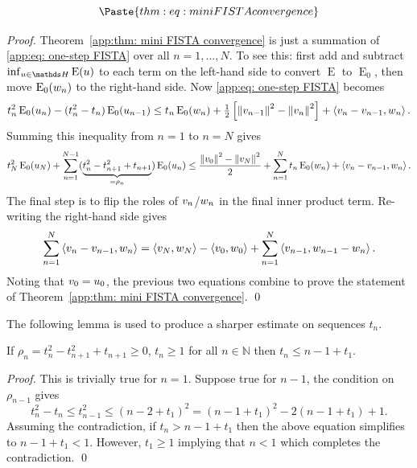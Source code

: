 \documentclass[smallextended]{svjour3}
\let\F\mathds\let\C\mathcal\newcommand{\R}{\F{R}}\newcommand{\A}{\tens{A}}
\newcommand{\norm}[1]{{\left\lVert #1 \right\rVert}}
\newcommand{\IP}[2]{\left\langle #1,#2 \right\rangle}
\newcommand{\op}[1]{\operatorname{#1}}
\newcommand{\1}{\F{1}}
\newcommand{\Emin}[1][\var0]{\inf_{#1\in\F H}\op{E}(#1)}
\newcommand*{\var}[1]{%
	\IfEqCase{#1}{%
		{0}{u}%
		{1}{v}%
		{2}{w}%
	}[u#1]%
}
\begin{document}
	
	
	\begin{theorem}\label{app:thm: mini FISTA convergence}
		\begin{equation}\label{app:eq: FISTA inequality}
			\Paste{thm:eq: mini FISTA convergence}
		\end{equation}
	\end{theorem}
	\begin{proof}
		Theorem~\ref{app:thm: mini FISTA convergence} is just a summation of \eqref{app:eq: one-step FISTA} over all $n=1,\ldots,N$. To see this: first add and subtract $\Emin$ to each term on the left-hand side to convert $\op{E}$ to $\op{E}_0$, then move $\op{E}_0(\var2_n)$ to the right-hand side. Now \eqref{app:eq: one-step FISTA} becomes
		\begin{equation}
			t_n^2\op{E}_0(\var0_n) - (t_n^2-t_n)\op{E}_0(\var0_{n-1}) \leq t_n\op{E}_0(\var2_n) + \tfrac1{2}\left[\norm{\var1_{n-1}}^2-\norm{\var1_n}^2\right] + \IP{\var1_n-\var1_{n-1}}{\var2_n}. 
		\end{equation}
		Summing this inequality from $n=1$ to $n=N$ gives
		\begin{equation}
			t_N^2\op{E}_0(\var0_N) + \sum_{n=1}^{N-1}(\underbrace{t_n^2-t_{n+1}^2+t_{n+1}}_{=\rho_n})\op{E}_0(\var0_n) \leq \frac{\norm{\var1_0}^2-\norm{\var1_N}^2}{2} + \sum_{n=1}^N t_n\op{E}_0(\var2_n)+\IP{\var1_n-\var1_{n-1}}{\var2_n}.
		\end{equation}
		The final step is to flip the roles of $\var1_n$/$\var2_n$ in the final inner product term. Re-writing the right-hand side gives
		\begin{equation}
			\sum_{n=1}^N\IP{\var1_n-\var1_{n-1}}{\var2_n} = \IP{\var1_N}{\var2_N} - \IP{\var1_0}{\var2_0}+ \sum_{n=1}^N\IP{\var1_{n-1}}{\var2_{n-1}-\var2_n}.
		\end{equation}
		Noting that $\var1_0=\var0_0$, the previous two equations combine to prove the statement of Theorem~\ref{app:thm: mini FISTA convergence}.
		\qed\end{proof}
	
	The following lemma is used to produce a sharper estimate on sequences $t_n$.
	\begin{lemma}\label{app: tn upper bound}
		If $\rho_n=t_{n}^2-t_{n+1}^2+t_{n+1}\geq0$, $t_n\geq 1$ for all $n\in\F N$ then $t_n\leq n-1 +t_1$.
	\end{lemma}
	\begin{proof}
		This is trivially true for $n=1$. Suppose true for $n-1$, the condition on $\rho_{n-1}$ gives
		\begin{equation}
			t_n^2 -t_n \leq t_{n-1}^2 \leq (n-2+t_1)^2 = (n-1+t_1)^2 -2(n-1+t_1) + 1.
		\end{equation}
		Assuming the contradiction, if $t_n> n-1+t_1$ then the above equation simplifies to $n-1+t_1 < 1$. However, $t_1\geq 1$ implying that $n<1$ which completes the contradiction.
		\qed\end{proof}
	
\end{document}
